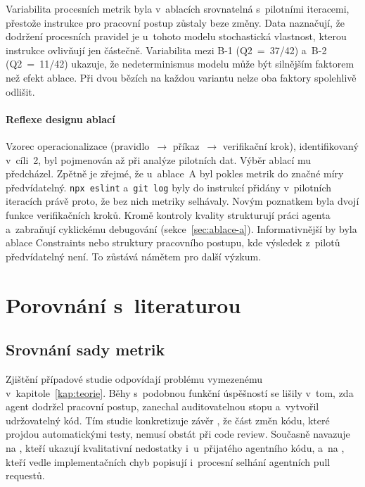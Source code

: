 Variabilita procesních metrik byla v~ablacích srovnatelná
s~pilotními iteracemi, přestože instrukce pro pracovní postup zůstaly beze
změny. Data naznačují, že dodržení procesních pravidel je u~tohoto modelu
stochastická vlastnost, kterou instrukce ovlivňují jen částečně.
Variabilita mezi B-1 (\acs{Q2}~=~37/42) a~B-2 (\acs{Q2}~=~11/42)
ukazuje, že nedeterminismus modelu může být silnějším faktorem než
efekt ablace. Při dvou bězích na každou variantu nelze oba faktory
spolehlivě odlišit.

\paragraph{Reflexe designu ablací}
Vzorec operacionalizace (pravidlo~$\to$ příkaz~$\to$ verifikační
krok), identifikovaný v~cíli~2, byl pojmenován až při analýze
pilotních dat. Výběr ablací mu předcházel. Zpětně je zřejmé, že
u~ablace~A byl pokles metrik do značné míry předvídatelný.
\texttt{npx eslint} a~\texttt{git log} byly do instrukcí přidány
v~pilotních iteracích právě proto, že bez nich metriky selhávaly.
Novým poznatkem byla dvojí funkce verifikačních kroků. Kromě
kontroly kvality strukturují práci agenta a~zabraňují cyklickému
debugování (sekce~\ref{sec:ablace-a}). Informativnější by byla
ablace Constraints nebo struktury pracovního postupu, kde výsledek z~pilotů
předvídatelný není. To zůstává námětem pro další výzkum.

\section{Porovnání s~literaturou}
\label{sec:porovnani-literatura}

\subsection{Srovnání sady metrik}

Zjištění případové studie odpovídají problému vymezenému
v~kapitole~\ref{kap:teorie}. Běhy s~podobnou funkční úspěšností
se lišily v~tom, zda agent dodržel pracovní postup, zanechal
auditovatelnou stopu a~vytvořil udržovatelný kód. Tím studie
konkretizuje závěr \textcite{metr2026}, že část změn kódu, které
projdou automatickými testy, nemusí obstát při code review.
Současně navazuje na \textcite{li2026beyondbugfixes}, kteří ukazují
kvalitativní nedostatky i~u~přijatého agentního kódu, a~na
\textcite{ehsani2026failedprs}, kteří vedle implementačních chyb
popisují i~procesní selhání agentních pull requestů.

